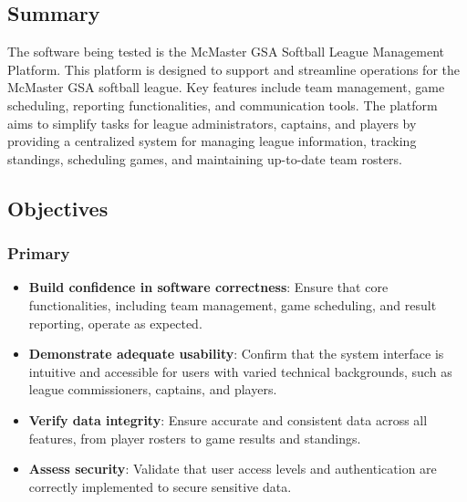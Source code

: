 \documentclass[12pt, titlepage]{article}
\begin{document}
\subsection{Summary}

The software being tested is the McMaster GSA Softball League Management Platform. This platform is designed to support and streamline operations for the McMaster GSA softball league. Key features include team management, game scheduling, reporting functionalities, and communication tools. The platform aims to simplify tasks for league administrators, captains, and players by providing a centralized system for managing league information, tracking standings, scheduling games, and maintaining up-to-date team rosters.

\subsection{Objectives}

\subsubsection*{Primary}
\begin{itemize}
    \item \textbf{Build confidence in software correctness}: Ensure that core functionalities, including team management, game scheduling, and result reporting, operate as expected.
    \item \textbf{Demonstrate adequate usability}: Confirm that the system interface is intuitive and accessible for users with varied technical backgrounds, such as league commissioners, captains, and players.
    \item \textbf{Verify data integrity}: Ensure accurate and consistent data across all features, from player rosters to game results and standings.
    \item \textbf{Assess security}: Validate that user access levels and authentication are correctly implemented to secure sensitive data.
\end{itemize}
\end{document}
